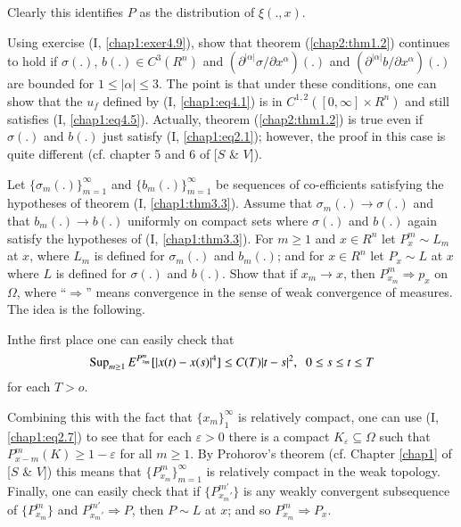 Clearly this identifies $P$ as the distribution of $\xi (.,x)$. 

\setcounter{exercise}{2}
\begin{exercise} %
Using exercise (I, \ref{chap1:exer4.9}), show that theorem
(\ref{chap2:thm1.2}) 
continues to hold 
if $\sigma (.)$,  $b(.)\in C^3 (R^n)$ and $(\partial^{|\alpha|}
\sigma/\partial x^\alpha) (.)$ and $(\partial^{|\alpha|} b/\partial
x^\alpha) (.)$ are bounded for $1 \leq |\alpha | \leq 3$. 
The point is that under these conditions, one can show that the $u_f$
defined by (I, \ref{chap1:eq4.1}) is in $C^{1,2}([0, \infty] \times R^n)$ and
still satisfies (I, \ref{chap1:eq4.5}). Actually, theorem
(\ref{chap2:thm1.2}) is true even if $\sigma (.)$ and $b(.)$ just
satisfy (I, \ref{chap1:eq2.1}); however, the proof in  
this case is quite different (cf. chapter 5 and 6 of [$S$ \& $V$]). 
\end{exercise}

\begin{exercise} %
Let $\{ \sigma_m (.)\}^\infty_{m=1}$ and $\{ b_m(.)\}^\infty_{m=1}$ be
sequences of co-efficients satisfying the hypotheses of theorem (I,
\ref{chap1:thm3.3}).  Assume that $\sigma_m(.)\to \sigma(.)$ and that
$b_m(.) \to 
b(.)$ uniformly on compact sets where $\sigma(.)$ and $b(.)$ again
satisfy the hypotheses of (I, \ref{chap1:thm3.3}). For $m \geq 1$ and
$x \in R^n$  
let $P^m_x \sim L_m$ at $x$, where $L_m$ is defined for $\sigma_m(.)$ and
$b_m(.)$; and for $x\in R^n$ let $P_x \sim L$ at $x$ where $L$ is
defined for $\sigma(.)$ and $b(.)$. Show that if $x_m \to x$, then
$P^m_{x_m}\Rightarrow p_x$ on $\Omega$, where ``$\Rightarrow$'' means
convergence in the sense of weak convergence of measures. The idea is
the following.  

In\pageoriginale the first place one can easily check that 
$$
\operatorname{Sup}_{m \geq 1} E^{P^m_{x_m}}[ | x(t) -x(s)|^4]\leq C(T)|t-s|^2, \;\; 0
\leq s \leq t \leq T 
$$
for each $T > o$.

Combining this with the fact that $\{x_m\}^\infty_1$ is relatively
compact, one can use (I, \ref{chap1:eq2.7}) to see that for each
$\varepsilon > 0$ 
there is a compact $K_\varepsilon \subseteq \Omega$ such that
$P^m_{x-m}(K) \geq 1-\varepsilon $ for all $m \geq 1$. By Prohorov's
theorem (cf. Chapter \ref{chap1} of [$S$ \& $V$]) this means that $\{
P^m_{x_m}\}^\infty_{m=1}$ is relatively compact in the weak
topology. Finally, one can easily check that if $\{ P^{m'}_{x_m'}\}$ is
any weakly convergent subsequence of $\{ P^m_{x_m}\}$ and
$P^{m'}_{x_m'}\Rightarrow P$, then $P \sim L$ at $x$; and so
$P^m_{x_m}\Rightarrow P_x$. 
\end{exercise}


